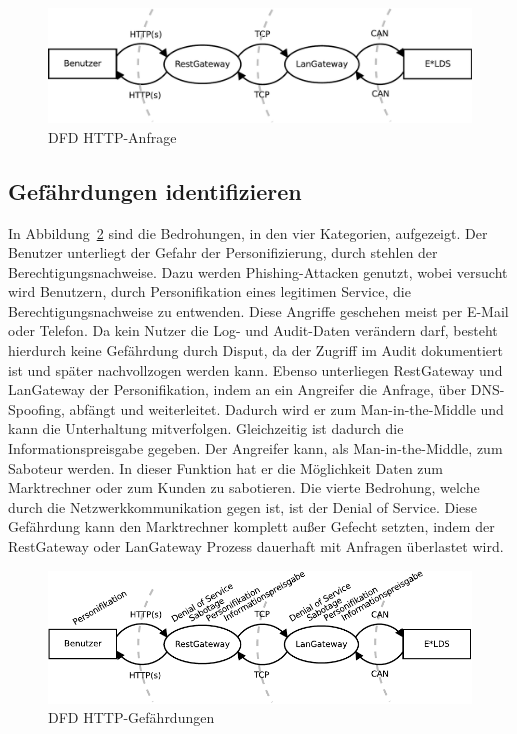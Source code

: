 \documentclass[11pt,a4paper]{report}
\begin{document}
\begin{figure}[htbp]
\centering
\includegraphics[scale=0.6]{images/dfd_http.pdf}
\caption{DFD HTTP-Anfrage}
\label{fig:dfd_http}
\end{figure}

\subsection{Gefährdungen identifizieren}

In Abbildung~\ref{fig:dfd_http_threat} sind die Bedrohungen, in den vier Kategorien, aufgezeigt. Der Benutzer unterliegt der Gefahr der Personifizierung, durch stehlen der Berechtigungsnachweise. Dazu werden Phishing-Attacken genutzt, wobei versucht wird Benutzern, durch Personifikation eines legitimen Service, die Berechtigungsnachweise zu entwenden. Diese Angriffe geschehen meist per E-Mail oder Telefon. Da kein Nutzer die Log- und Audit-Daten verändern darf, besteht hierdurch keine Gefährdung durch Disput, da der Zugriff im Audit dokumentiert ist und später nachvollzogen werden kann. Ebenso unterliegen RestGateway und LanGateway der Personifikation, indem an ein Angreifer die Anfrage, über DNS-Spoofing, abfängt und weiterleitet. Dadurch wird er zum Man-in-the-Middle und kann die Unterhaltung mitverfolgen. Gleichzeitig ist dadurch die Informationspreisgabe gegeben. Der Angreifer kann, als Man-in-the-Middle, zum Saboteur werden. In dieser Funktion hat er die Möglichkeit Daten zum Marktrechner oder zum Kunden zu sabotieren. Die vierte Bedrohung, welche durch die Netzwerkkommunikation gegen ist, ist der Denial of Service. Diese Gefährdung kann den Marktrechner komplett außer Gefecht setzten, indem der RestGateway oder LanGateway Prozess dauerhaft mit Anfragen überlastet wird.

\begin{figure}[htbp]
\centering
\includegraphics[scale=1]{images/dfd_http_threat.pdf}
\caption{DFD HTTP-Gefährdungen}
\label{fig:dfd_http_threat}
\end{figure}
\end{document}
